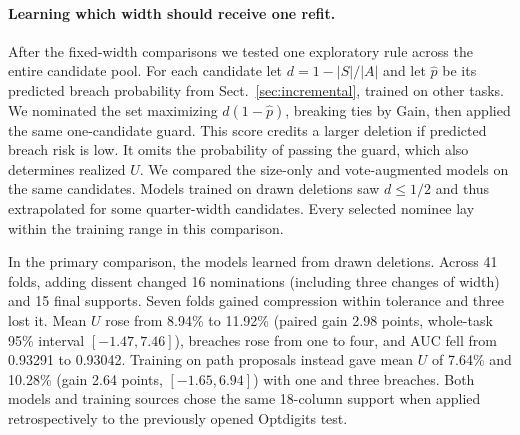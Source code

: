 \paragraph{Learning which width should receive one refit.}
After the fixed-width comparisons we tested one exploratory rule across the entire candidate pool. For each candidate let $d=1-|S|/|A|$ and let $\hat p$ be its predicted breach probability from Sect.~\ref{sec:incremental}, trained on other tasks. We nominated the set maximizing $d(1-\hat p)$, breaking ties by Gain, then applied the same one-candidate guard. This score credits a larger deletion if predicted breach risk is low. It omits the probability of passing the guard, which also determines realized $U$. We compared the size-only and vote-augmented models on the same candidates. Models trained on drawn deletions saw $d\le1/2$ and thus extrapolated for some quarter-width candidates. Every selected nominee lay within the training range in this comparison.

In the primary comparison, the models learned from drawn deletions. Across 41 folds, adding dissent changed 16 nominations (including three changes of width) and 15 final supports. Seven folds gained compression within tolerance and three lost it. Mean $U$ rose from 8.94\% to 11.92\% (paired gain 2.98 points, whole-task 95\% interval $[-1.47,7.46]$), breaches rose from one to four, and AUC fell from 0.93291 to 0.93042. Training on path proposals instead gave mean $U$ of 7.64\% and 10.28\% (gain 2.64 points, $[-1.65,6.94]$) with one and three breaches. Both models and training sources chose the same 18-column support when applied retrospectively to the previously opened Optdigits test.
